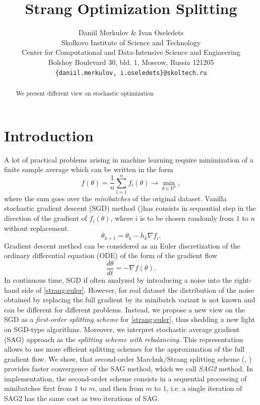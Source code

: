 \documentclass{article} %
\title{Strang Optimization Splitting}
\author{Daniil Merkulov \& Ivan Oseledets \\
Skolkovo Institute of Science and Technology\\
Center for Computational and Data-Intensive Science and Engineering\\
Bolshoy Boulevard 30, bld. 1, Moscow, Russia 121205 \\
\texttt{\{daniil.merkulov, i.oseledets\}@skoltech.ru} \\
}
\begin{document}
\maketitle

\begin{abstract}
We present different view on stochastic optimization
\end{abstract}

\tableofcontents

\section{Introduction}
A lot of practical problems arising in machine learning require minimization of a finite sample average which can be written in the form
\begin{equation}\label{strang:finitesum}
    f(\theta) = \frac{1}{n} \sum_{i=1}^n f_i(\theta) \rightarrow \min_{\theta \in \mathbb{R}^p},
\end{equation}
where the sum goes over the \emph{minibatches} of the original dataset. Vanilla stochastic gradient descent (SGD) method (\cite{robbins1951stochastic})has consists in sequential step in the direction of the gradient of $f_i(\theta)$, where $i$ is to be chosen randomly from $1$ to $n$ without replacement.
$$
\theta_{k+1} = \theta_{k} - h_{k} \nabla f_i.
$$
Gradient descent method can be considered as an Euler discretization of the ordinary differential equation (ODE) of the form of the gradient flow
\begin{equation}\label{strang:euler}
    \frac{d \theta}{d t} = -\nabla f(\theta).
\end{equation}
In continuous time, SGD if often analyzed by introducing a noise into the right-hand side of \eqref{strang:euler}. However, for real dataset the distribution of the noise obtained by replacing the full gradient by its minibatch variant is not known and can be different for different problems. Instead, we propose a new view on the SGD as a \emph{first-order splitting scheme} for \eqref{strang:euler}, thus shedding a new light on SGD-type algorithms. Moreover, we interpret stochastic average gradient (SAG)\cite{schmidt2017minimizing} approach as the \emph{splitting scheme with rebalancing}. This representation allows to use more efficient splitting schemes for the approximation of the full gradient flow. We show, that second-order Marchuk/Strang splitting scheme (\cite{marchuk1968some}, \cite{strang1968construction}) provides faster convergence of the SAG method, which we call \emph{SAG2} method. In implementation, the second-order scheme consists in a sequential processing of minibatches first from $1$ to $m$, and then from $m$ to $1$, i.e. a single iteration of SAG2 has the same cost as two iterations of SAG.
\end{document}
